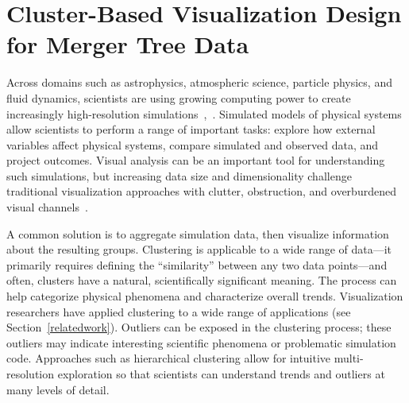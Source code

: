\chapter{Cluster-Based Visualization Design for Merger Tree Data}



Across domains such as astrophysics, atmospheric science, particle physics, and fluid dynamics, scientists are using growing computing power to create increasingly high-resolution simulations~\cite{hacc},~\cite{Steed:2013:BDV:2538033.2538071}. Simulated models of physical systems allow scientists to perform a range of important tasks: explore how external variables affect physical systems, compare simulated and observed data, and project outcomes. Visual analysis can be an important tool for understanding such simulations, but increasing data size and dimensionality challenge traditional visualization approaches with clutter, obstruction, and overburdened visual channels~\cite{taxonomy_clutter_reduction}. %


A common solution is to aggregate simulation data, then visualize information about the resulting groups. Clustering is applicable to a wide range of data---it primarily requires defining the ``similarity'' between any two data points---and often, clusters have a natural, scientifically significant meaning. The process can help categorize physical phenomena and characterize overall trends. Visualization researchers have applied clustering to a wide range of applications (see Section~\ref{relatedwork}). Outliers can be exposed in the clustering process; these outliers may indicate interesting scientific phenomena or problematic simulation code. Approaches such as hierarchical clustering allow for intuitive multi-resolution exploration so that scientists can understand trends and outliers at many levels of detail. 

